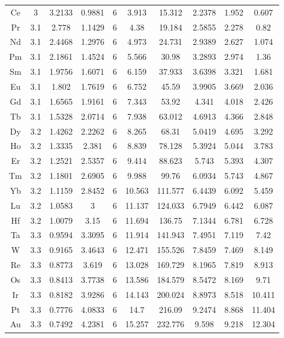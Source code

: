 \documentclass[journal]{IEEEtran}
\begin{document}
{\begin{longtable}{|c|c|c|c|c|c|c|c|c|c|}
		Ce       & 3   & 3.2133 & 0.9881 & 6 & 3.913  & 15.312  & 2.2378  & 1.952  & 0.607   \\
		Pr       & 3.1 & 2.778  & 1.1429 & 6 & 4.38   & 19.184  & 2.5855  & 2.278  & 0.82    \\
		Nd       & 3.1 & 2.4468 & 1.2976 & 6 & 4.973  & 24.731  & 2.9389  & 2.627  & 1.074   \\
		Pm       & 3.1 & 2.1861 & 1.4524 & 6 & 5.566  & 30.98   & 3.2893  & 2.974  & 1.36    \\
		Sm       & 3.1 & 1.9756 & 1.6071 & 6 & 6.159  & 37.933  & 3.6398  & 3.321  & 1.681   \\
		Eu       & 3.1 & 1.802  & 1.7619 & 6 & 6.752  & 45.59   & 3.9905  & 3.669  & 2.036   \\
		Gd       & 3.1 & 1.6565 & 1.9161 & 6 & 7.343  & 53.92   & 4.341   & 4.018  & 2.426   \\
		Tb       & 3.1 & 1.5328 & 2.0714 & 6 & 7.938  & 63.012  & 4.6913  & 4.366  & 2.848   \\
		Dy       & 3.2 & 1.4262 & 2.2262 & 6 & 8.265  & 68.31   & 5.0419  & 4.695  & 3.292   \\
		Ho       & 3.2 & 1.3335 & 2.381  & 6 & 8.839  & 78.128  & 5.3924  & 5.044  & 3.783   \\
		Er       & 3.2 & 1.2521 & 2.5357 & 6 & 9.414  & 88.623  & 5.743   & 5.393  & 4.307   \\
		Tm       & 3.2 & 1.1801 & 2.6905 & 6 & 9.988  & 99.76   & 6.0934  & 5.743  & 4.867   \\
		Yb       & 3.2 & 1.1159 & 2.8452 & 6 & 10.563 & 111.577 & 6.4439  & 6.092  & 5.459   \\
		Lu       & 3.2 & 1.0583 & 3      & 6 & 11.137 & 124.033 & 6.7949  & 6.442  & 6.087   \\
		Hf       & 3.2 & 1.0079 & 3.15   & 6 & 11.694 & 136.75  & 7.1344  & 6.781  & 6.728   \\
		Ta       & 3.3 & 0.9594 & 3.3095 & 6 & 11.914 & 141.943 & 7.4951  & 7.119  & 7.42    \\
		W        & 3.3 & 0.9165 & 3.4643 & 6 & 12.471 & 155.526 & 7.8459  & 7.469  & 8.149   \\
		Re       & 3.3 & 0.8773 & 3.619  & 6 & 13.028 & 169.729 & 8.1965  & 7.819  & 8.913   \\
		Os       & 3.3 & 0.8413 & 3.7738 & 6 & 13.586 & 184.579 & 8.5472  & 8.169  & 9.71    \\
		Ir       & 3.3 & 0.8182 & 3.9286 & 6 & 14.143 & 200.024 & 8.8973  & 8.518  & 10.411  \\
		Pt       & 3.3 & 0.7776 & 4.0833 & 6 & 14.7   & 216.09  & 9.2474  & 8.868  & 11.404  \\
		Au       & 3.3 & 0.7492 & 4.2381 & 6 & 15.257 & 232.776 & 9.598   & 9.218  & 12.304 \\
		\hline
	\end{longtable}
}
\end{document}

